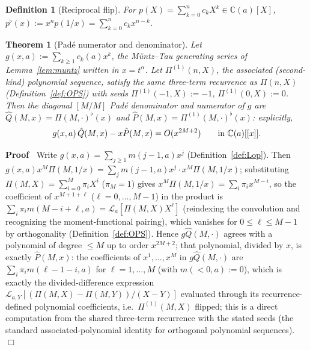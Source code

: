 \documentclass{article}
\newcommand{\assign}{:=}
\newenvironment{proof}{\noindent\textbf{Proof\ }}{\hspace*{\fill}$\Box$\medskip}
\newtheorem{definition}{Definition}
\newtheorem{theorem}{Theorem}
\newcommand{\C}{\mathbb{C}}
\newcommand{\Lop}{\mathcal{L}}
\begin{document}
\begin{definition}
  [Reciprocal flip]\label{def:flip} For $p (X) = \sum_{k = 0}^n c_k X^k \in \C
  (a) [X]$, $p^{\flat} (x) \assign x^n p (1 / x) = \sum_{k = 0}^n c_k x^{n -
  k}$.
\end{definition}

\begin{theorem}
  [Pad{\'e} numerator and denominator]\label{thm:padedenom} Let $g (x, a)
  \assign \sum_{k \ge 1} c_k (a) x^k$, the M{\"u}ntz--Tau generating series
  of Lemma~\ref{lem:muntz} written in $x = t^{\alpha}$. Let $\Pi^{(1)} (n,
  X)$, the associated (second-kind) polynomial sequence, satisfy the same
  three-term recurrence as $\Pi (n, X)$ (Definition~\ref{def:OPS}) with seeds
  $\Pi^{(1)} (- 1, X) \assign - 1$, $\Pi^{(1)} (0, X) \assign 0$. Then the
  diagonal $[M / M]$ Pad{\'e} denominator and numerator of $g$ are $\hat{Q}
  (M, x) = \Pi (M, \cdot)^{\flat} (x)$ and $\hat{P} (M, x) = \Pi^{(1)} (M,
  \cdot)^{\flat} (x)$: explicitly,
  \[ g (x, a)  \hspace{0.17em} \hat{Q} (M, x) - x \hat{P} (M, x) = O (x^{2 M +
     2}) \qquad \text{in } \C (a) [[x]] . \]
\end{theorem}

\begin{proof}
  Write $g (x, a) = \sum_{j \ge 1} m (j - 1, a) x^j$ (Definition~\ref{def:Lop}).
  Then $g (x, a) x^M \Pi (M, 1 / x) = \sum_j m (j - 1, a) x^j \cdot x^M \Pi (M,
  1 / x)$; substituting $\Pi (M, X) = \sum_{i = 0}^M \pi_i X^i$ ($\pi_M = 1$)
  gives $x^M \Pi (M, 1 / x) = \sum_i \pi_i x^{M - i}$, so the coefficient of
  $x^{M + 1 + \ell}$ ($\ell = 0, \ldots, M - 1$) in the product is $\sum_i
  \pi_i m (M - i + \ell, a) = \Lop_a [\Pi (M, X)  X^{\ell}]$ (reindexing the
  convolution and recognizing the moment-functional pairing), which vanishes
  for $0 \le \ell \le M - 1$ by orthogonality (Definition~\ref{def:OPS}).
  Hence $g \hat{Q} (M, \cdot)$ agrees with a polynomial of degree $\le M$ up
  to order $x^{2 M + 2}$; that polynomial, divided by $x$, is exactly
  $\hat{P} (M, x)$: the coefficients of $x^1, \ldots, x^M$ in $g \hat{Q} (M,
  \cdot)$ are $\sum_{i} \pi_i m (\ell - 1 - i, a)$ for $\ell = 1, \ldots, M$
  (with $m (< 0, a) \assign 0$), which is exactly the divided-difference
  expression $\Lop_{a, Y} [(\Pi (M, X) - \Pi (M, Y)) / (X - Y)]$ evaluated
  through its recurrence-defined polynomial coefficients, i.e.\ $\Pi^{(1)}
  (M, X)$ flipped; this is a direct computation from the shared three-term
  recurrence with the stated seeds (the standard associated-polynomial
  identity for orthogonal polynomial sequences).
\end{proof}
\end{document}

